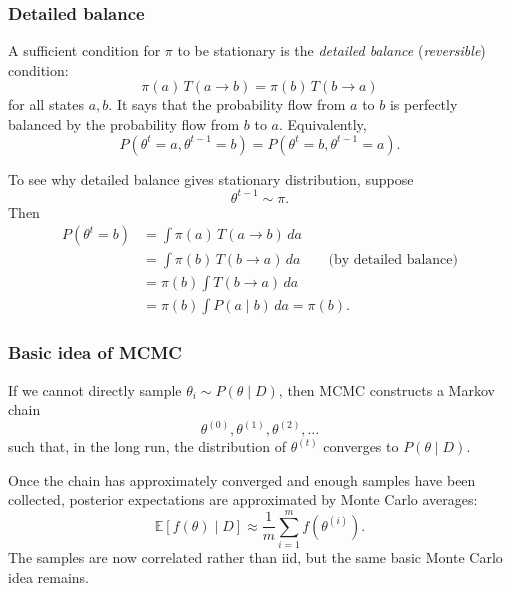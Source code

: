 \documentclass[11pt, titlepage]{article} %
\numberwithin{equation}{section}
\theoremstyle{definition}
\numberwithin{assumption}{section}
\begin{document}
\subsubsection*{Detailed balance}

A sufficient condition for $\pi$ to be stationary is the \textit{detailed balance} (\textit{reversible}) condition:
\begin{equation*}
    \pi(a)\,T(a\to b)=\pi(b)\,T(b\to a)
\end{equation*}
for all states $a,b$. It says that the probability flow from $a$ to $b$ is perfectly balanced by the probability flow from $b$ to $a$. Equivalently, 
\begin{equation*}
    P(\theta^t=a, \theta^{t-1}=b)=P(\theta^t=b, \theta^{t-1}=a).
\end{equation*}

To see why detailed balance gives stationary distribution, suppose
\begin{equation*}
    \theta^{t-1}\sim \pi.
\end{equation*}
Then
\begin{align*}
    P(\theta^t=b)
    &=
    \int \pi(a)\,T(a\to b)\,da\\
    &=
    \int \pi(b)\,T(b\to a)\,da \qquad \text{(by detailed balance)}\\
    &=
    \pi(b)\int T(b\to a)\,da\\
    &=\pi(b)\int P(a\mid b)\,da=
    \pi(b).
\end{align*}


\subsubsection*{Basic idea of MCMC}

If we cannot directly sample
$\theta_i\sim P(\theta\mid D)$,
then MCMC constructs a Markov chain
\begin{equation*}
    \theta^{(0)},\theta^{(1)},\theta^{(2)},\dots
\end{equation*}
such that, in the long run, the distribution of $\theta^{(t)}$ converges to $P(\theta\mid D)$.

Once the chain has approximately converged and enough samples have been collected, posterior expectations are approximated by Monte Carlo averages:
\begin{equation*}
    \mathbb{E}[f(\theta)\mid D]
    \approx
    \frac{1}{m}\sum_{i=1}^m f(\theta^{(i)}).
\end{equation*}
The samples are now correlated rather than iid, but the same basic Monte Carlo idea remains.
\end{document}
